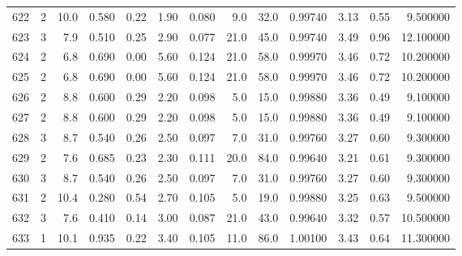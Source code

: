 \begin{tabular}{lrrrrrrrrrrrr}
622  &        2 &           10.0 &             0.580 &         0.22 &            1.90 &      0.080 &                  9.0 &                  32.0 &  0.99740 &  3.13 &       0.55 &   9.500000 \\
623  &        3 &            7.9 &             0.510 &         0.25 &            2.90 &      0.077 &                 21.0 &                  45.0 &  0.99740 &  3.49 &       0.96 &  12.100000 \\
624  &        2 &            6.8 &             0.690 &         0.00 &            5.60 &      0.124 &                 21.0 &                  58.0 &  0.99970 &  3.46 &       0.72 &  10.200000 \\
625  &        2 &            6.8 &             0.690 &         0.00 &            5.60 &      0.124 &                 21.0 &                  58.0 &  0.99970 &  3.46 &       0.72 &  10.200000 \\
626  &        2 &            8.8 &             0.600 &         0.29 &            2.20 &      0.098 &                  5.0 &                  15.0 &  0.99880 &  3.36 &       0.49 &   9.100000 \\
627  &        2 &            8.8 &             0.600 &         0.29 &            2.20 &      0.098 &                  5.0 &                  15.0 &  0.99880 &  3.36 &       0.49 &   9.100000 \\
628  &        3 &            8.7 &             0.540 &         0.26 &            2.50 &      0.097 &                  7.0 &                  31.0 &  0.99760 &  3.27 &       0.60 &   9.300000 \\
629  &        2 &            7.6 &             0.685 &         0.23 &            2.30 &      0.111 &                 20.0 &                  84.0 &  0.99640 &  3.21 &       0.61 &   9.300000 \\
630  &        3 &            8.7 &             0.540 &         0.26 &            2.50 &      0.097 &                  7.0 &                  31.0 &  0.99760 &  3.27 &       0.60 &   9.300000 \\
631  &        2 &           10.4 &             0.280 &         0.54 &            2.70 &      0.105 &                  5.0 &                  19.0 &  0.99880 &  3.25 &       0.63 &   9.500000 \\
632  &        3 &            7.6 &             0.410 &         0.14 &            3.00 &      0.087 &                 21.0 &                  43.0 &  0.99640 &  3.32 &       0.57 &  10.500000 \\
633  &        1 &           10.1 &             0.935 &         0.22 &            3.40 &      0.105 &                 11.0 &                  86.0 &  1.00100 &  3.43 &       0.64 &  11.300000 \\

\end{tabular}
